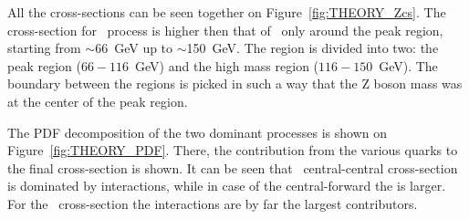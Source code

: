 All the cross-sections can be seen together on Figure~\ref{fig:THEORY_Zcs}. The cross-section for \Zee\ process is higher then that of \gee\ only around the peak region, starting from $\sim$66~GeV up to $\sim$150~GeV. The region is divided into two: the peak region ($66 - 116$~GeV) and the high mass region ($116 - 150$~GeV). The boundary between the regions is picked in such a way that the Z boson mass was at the center of the peak region.


\begin{figure}
\end{figure}

The PDF decomposition of the two dominant processes is shown on Figure~\ref{fig:THEORY_PDF}. There, the contribution from the various quarks to the final cross-section is shown. It can be seen that \Zee\ central-central cross-section is dominated by  interactions, while in case of the central-forward the  is larger. For the \gee\ cross-section the  interactions are by far the largest contributors.
